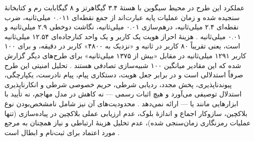 عملکرد این طرح در محیط سیگوین با هستهٔ  ۳.۴ گیگاهرتز و ۸ گیگابایت رم و کتابخانهٔ  سنجیده شده و زمان عملیات پایه عبارت‌اند از جمع نقطه‌ای ۰.۰۱۱ میلی‌ثانیه، ضرب نقطه‌ای ۲.۴ میلی‌ثانیه، درهم‌سازی ۰.۰۱ میلی‌ثانیه، نگاشت دوخطی ۲.۹ میلی‌ثانیه و  ۰.۰۱ میلی‌ثانیه \cite{mariaBAIVEfficientBlockchainBased2022}. هزینهٔ احراز هویت یک کاربر و یک واحد کنارجاده‌ای ۱۲.۵۴ میلی‌ثانیه است، یعنی تقریباً ۸۰ کاربر در ثانیه و «نزدیک به ۴۸۰۰» کاربر در دقیقه، و برای ۱۰۰ کاربر ۱۲۹۱ میلی‌ثانیه در مقابل «بیش از ۱۳۷۵ میلی‌ثانیه» برای طرح‌های دیگر گزارش شده که این مقادیر میانگین ۱۰۰ شبیه‌سازی تصادفی هستند \cite{mariaBAIVEfficientBlockchainBased2022}. تحلیل امنیتی این طرح صرفاً استدلالی است و در برابر جعل هویت، دستکاری پیام، پیام نادرست، یکپارچگی، پیوندناپذیری، پخش مجدد، ردیابی شرطی، حریم خصوصی شرطی و انکارناپذیری استدلال توصیفی می‌آورد و هیچ اثبات رسمی — نه کاهش در مدل مهاجم، نه تأیید با ابزارهایی مانند  یا  — ارائه نمی‌دهد \cite{mariaBAIVEfficientBlockchainBased2022}. محدودیت‌های آن نیز شامل نامشخص‌بودن نوع بلاکچین، سازوکار اجماع و اندازهٔ بلوک، عدم ارزیابی عملی بلاکچین در پیاده‌سازی (تنها عملیات رمزنگاری زمان‌سنجی شده)، عدم تحلیل هزینهٔ ارتباطی و نیاز همچنان به مرجع مورد اعتماد برای ثبت‌نام و ابطال است \cite{mariaBAIVEfficientBlockchainBased2022}.

